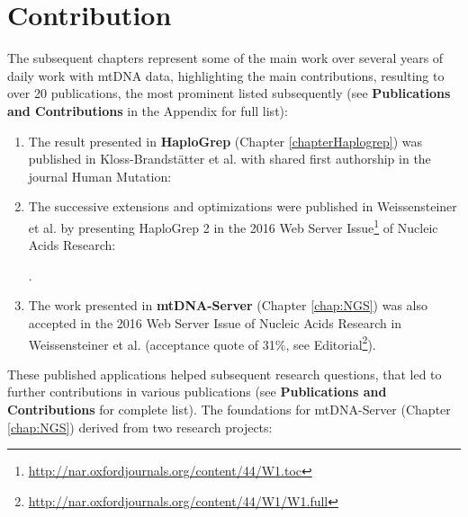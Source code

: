 \section{Contribution}


The subsequent chapters represent some of the main work over several years of daily work with mtDNA data, highlighting the main contributions, resulting to over 20 publications, the most prominent listed subsequently (see \textbf{Publications and Contributions} in the Appendix for full list):

\begin{enumerate}
\item 
The result presented in \textbf{HaploGrep} (Chapter \ref{chapterHaplogrep}) was published in Kloss-Brandst\"atter et al. with shared first authorship in the journal Human Mutation:

\item 
The successive extensions and optimizations were published in Weissensteiner et al. by presenting HaploGrep 2 in the 2016 Web Server Issue\footnote{\url{http://nar.oxfordjournals.org/content/44/W1.toc}} of Nucleic Acids Research:

.
\item 
The work presented in \textbf{mtDNA-Server} (Chapter \ref{chap:NGS}) was also accepted in the 2016 Web Server Issue of Nucleic Acids Research in Weissensteiner et al. (acceptance quote of 31\%, see Editorial\footnote{\url{http://nar.oxfordjournals.org/content/44/W1/W1.full}}).

\end{enumerate}
These published applications helped subsequent research questions, that led to further contributions in various publications (see \textbf{Publications and Contributions} for complete list). 
The foundations for mtDNA-Server (Chapter \ref{chap:NGS}) derived from two research projects: 
